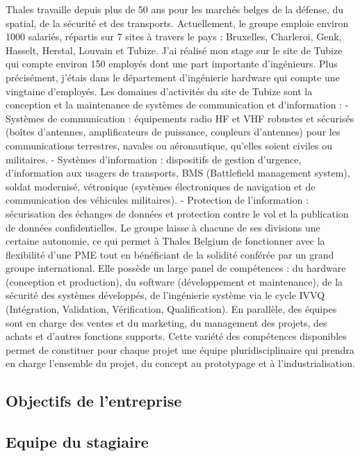 \documentclass[10pt, oneside, a4paper]{article}
\begin{document}
Thales travaille depuis plus de 50 ans pour les marchés belges de la défense, du spatial, de la sécurité et des transports. Actuellement, le groupe emploie environ 1000 salariés, répartis sur 7 sites à travers le pays : Bruxelles, Charleroi, Genk, Hasselt, Herstal, Louvain et Tubize.
J’ai réalisé mon stage sur le site de Tubize qui compte environ 150 employés dont une part importante d’ingénieurs. Plus précisément, j’étais dans le département d’ingénierie hardware qui compte une vingtaine d’employés.
Les domaines d’activités du site de Tubize sont la conception et la maintenance de systèmes de communication et d’information :
- Systèmes de communication : équipements radio HF et VHF robustes et sécurisés (boîtes d’antennes, amplificateurs de puissance, coupleurs d’antennes) pour les communications terrestres, navales ou aéronautique, qu’elles soient civiles ou militaires.
- Systèmes d’information : dispositifs de gestion d’urgence, d’information aux usagers de transports, BMS (Battlefield management system), soldat modernisé, vétronique (systèmes électroniques de navigation et de communication des véhicules militaires).
- Protection de l’information : sécurisation des échanges de données et protection contre le vol et la publication de données confidentielles.
Le groupe laisse à chacune de ses divisions une certaine autonomie, ce qui permet à Thales Belgium de fonctionner avec la flexibilité d’une PME tout en bénéficiant de la solidité conférée par un grand groupe international. Elle possède un large panel de compétences : du hardware (conception et production), du software (développement et maintenance), de la sécurité des systèmes développés, de l’ingénierie système via le cycle IVVQ (Intégration, Validation, Vérification, Qualification). En parallèle, des équipes sont en charge des ventes et du marketing, du management des projets, des achats et d’autres fonctions supports. Cette variété des compétences disponibles permet de constituer pour chaque projet une équipe pluridisciplinaire qui prendra en charge l’ensemble du projet, du concept au prototypage et à l’industrialisation.


\subsection{Objectifs de l'entreprise}


\subsection{Equipe du stagiaire}
\end{document}

